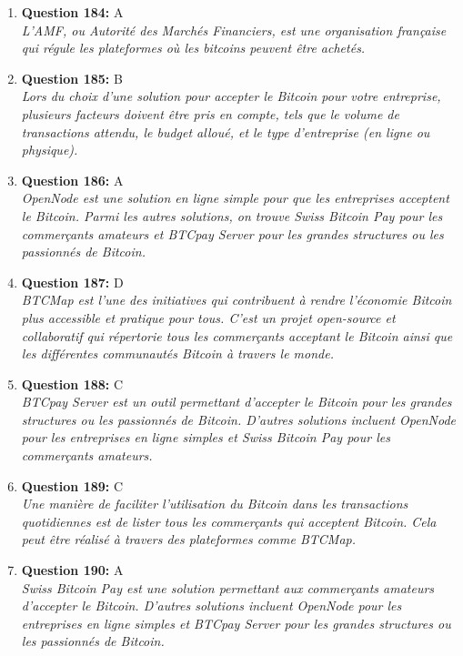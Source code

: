 \documentclass[12pt,a4paper]{article}
\begin{document}
\begin{enumerate}
\item \textbf{Question 184:} A
\\ \textit{L'AMF, ou Autorité des Marchés Financiers, est une organisation française qui régule les plateformes où les bitcoins peuvent être achetés.}

\item \textbf{Question 185:} B
\\ \textit{Lors du choix d'une solution pour accepter le Bitcoin pour votre entreprise, plusieurs facteurs doivent être pris en compte, tels que le volume de transactions attendu, le budget alloué, et le type d'entreprise (en ligne ou physique).}

\item \textbf{Question 186:} A
\\ \textit{OpenNode est une solution en ligne simple pour que les entreprises acceptent le Bitcoin. Parmi les autres solutions, on trouve Swiss Bitcoin Pay pour les commerçants amateurs et BTCpay Server pour les grandes structures ou les passionnés de Bitcoin.}

\item \textbf{Question 187:} D
\\ \textit{BTCMap est l'une des initiatives qui contribuent à rendre l'économie Bitcoin plus accessible et pratique pour tous. C'est un projet open-source et collaboratif qui répertorie tous les commerçants acceptant le Bitcoin ainsi que les différentes communautés Bitcoin à travers le monde.}

\item \textbf{Question 188:} C
\\ \textit{BTCpay Server est un outil permettant d'accepter le Bitcoin pour les grandes structures ou les passionnés de Bitcoin. D'autres solutions incluent OpenNode pour les entreprises en ligne simples et Swiss Bitcoin Pay pour les commerçants amateurs.}

\item \textbf{Question 189:} C
\\ \textit{Une manière de faciliter l'utilisation du Bitcoin dans les transactions quotidiennes est de lister tous les commerçants qui acceptent Bitcoin. Cela peut être réalisé à travers des plateformes comme BTCMap.}

\item \textbf{Question 190:} A
\\ \textit{Swiss Bitcoin Pay est une solution permettant aux commerçants amateurs d'accepter le Bitcoin. D'autres solutions incluent OpenNode pour les entreprises en ligne simples et BTCpay Server pour les grandes structures ou les passionnés de Bitcoin.}


\end{enumerate}
\end{document}
